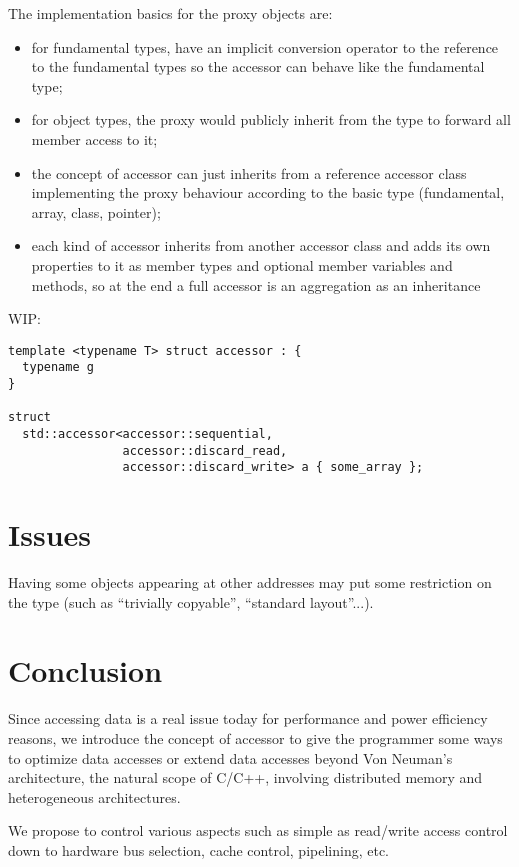\documentclass[a4paper]{article}
\begin{document}
The implementation basics for the proxy objects are:
\begin{itemize}
\item for fundamental types, have an implicit conversion operator to
  the reference to the fundamental types so the accessor can behave
  like the fundamental type;
\item for object types, the proxy would publicly inherit from the type to
  forward all member access to it;
\item the concept of accessor can just inherits from a reference
  accessor class implementing the proxy behaviour according to the
  basic type (fundamental, array, class, pointer);
\item each kind of accessor inherits from another accessor class and
  adds its own properties to it as member types and optional member
  variables and methods, so at the end a full accessor is an
  aggregation as an inheritance 
\end{itemize}

WIP:
\begin{lstlisting}
template <typename T> struct accessor : {
  typename g
}

struct
  std::accessor<accessor::sequential,
                accessor::discard_read,
                accessor::discard_write> a { some_array };

\end{lstlisting}


\section{Issues}
\label{sec:issues}

Having some objects appearing at other addresses may put some
restriction on the type (such as ``trivially copyable'', ``standard
layout''...).


\section{Conclusion}
\label{sec:conclusion}

Since accessing data is a real issue today for performance and power
efficiency reasons, we introduce the concept of accessor to give the
programmer some ways to optimize data accesses or extend data accesses
beyond Von Neuman's architecture, the natural scope of C/C++,
involving distributed memory and heterogeneous architectures.

We propose to control various aspects such as simple as read/write
access control down to hardware bus selection, cache control,
pipelining, etc.
\end{document}
